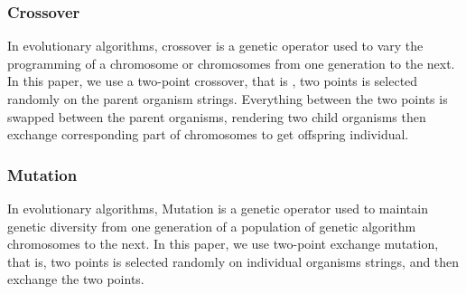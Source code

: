 \subsubsection{Crossover}
In evolutionary algorithms, crossover is a genetic operator used to vary the
programming of a chromosome or chromosomes from one generation to the next.  In
this paper, we use a two-point crossover, that is , two points is selected
randomly on the parent organism strings. Everything between the two points is
swapped between the parent organisms, rendering two child organisms then
exchange corresponding part of chromosomes to get offspring individual.

\subsubsection{Mutation}
In evolutionary algorithms, Mutation is a genetic operator used to maintain
genetic diversity from one generation of a population of genetic algorithm
chromosomes to the next.  In this paper, we use two-point exchange mutation,
that is, two points is selected randomly on individual organisms strings, and
then exchange the two points.
